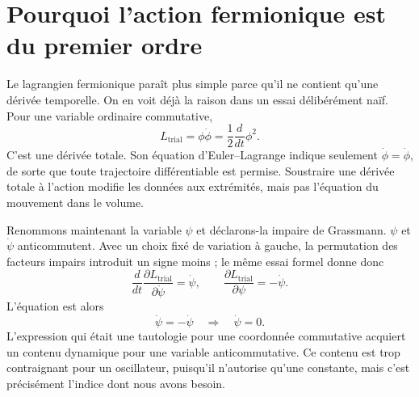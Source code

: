 \section{Pourquoi l’action fermionique est du premier ordre}

Le lagrangien fermionique paraît plus simple parce qu’il ne contient qu’une dérivée temporelle. On en voit déjà la raison dans un essai délibérément naïf. Pour une variable ordinaire commutative,
\begin{equation}
L_{\mathrm{trial}}=\phi\dot\phi
=\frac{1}{2}\frac{d}{dt}\phi^2.
\end{equation}
C’est une dérivée totale. Son équation d’Euler--Lagrange indique seulement \(\dot\phi=\dot\phi\), de sorte que toute trajectoire différentiable est permise. Soustraire une dérivée totale à l’action modifie les données aux extrémités, mais pas l’équation du mouvement dans le volume.

Renommons maintenant la variable \(\psi\) et déclarons-la impaire de Grassmann. \(\psi\) et \(\dot\psi\) anticommutent. Avec un choix fixé de variation à gauche, la permutation des facteurs impairs introduit un signe moins ; le même essai formel donne donc
\begin{equation}
\frac{d}{dt}\frac{\partial L_{\mathrm{trial}}}{\partial\dot\psi}
=\dot\psi,
\qquad
\frac{\partial L_{\mathrm{trial}}}{\partial\psi}
=-\dot\psi.
\end{equation}
L’équation est alors
\begin{equation}
\dot\psi=-\dot\psi
\quad\Longrightarrow\quad
\dot\psi=0.
\label{eq:l7-constant-fermion}
\end{equation}
L’expression qui était une tautologie pour une coordonnée commutative acquiert un contenu dynamique pour une variable anticommutative. Ce contenu est trop contraignant pour un oscillateur, puisqu’il n’autorise qu’une constante, mais c’est précisément l’indice dont nous avons besoin.

\begin{classroomqa}
\end{classroomqa}

